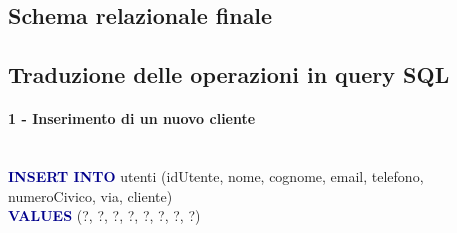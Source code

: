 \documentclass[a4paper,12pt, oneside]{article}
\begin{document}
\newpage
\subsection{Schema relazionale finale}

\vspace*{\fill}

\noindent{}

\subsection{Traduzione delle operazioni in query SQL}

\paragraph{1 - Inserimento di un nuovo cliente}
\hphantom{A}\\    %
\textcolor{darkBlue}{\textbf{INSERT INTO}} utenti (idUtente, nome, cognome, email, telefono, numeroCivico, via, cliente)
\\\textcolor{darkBlue}{\textbf{VALUES}} (?, ?, ?, ?, ?, ?, ?, ?)
\end{document}
